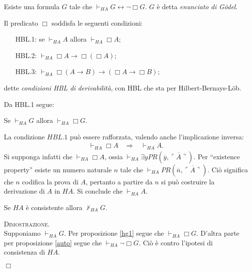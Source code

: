 	\begin{prop}
	\label{auto}
	Esiste una formula $G$ tale che $\vdash_{HA} G \leftrightarrow\neg\Box G$.
	$G$ \`e detta \textit{enunciato di G\"odel}.
	\end{prop}

	\begin{thm} Il predicato $\Box$ soddisfa le seguenti condizioni:

	\begin{itemize}
 	\item[\small{HBL.1}:] se $\vdash_{HA}A$ allora $\vdash_{HA}\Box A$;
 	\item[\small{HBL.2}:] $\vdash_{HA} \Box A\rightarrow \Box(\Box A)$;
 	\item[\small{HBL.3}:] $\vdash_{HA} \Box(A\rightarrow B)
 	\rightarrow (\Box A\rightarrow \Box B)$;
	\end{itemize}
	dette \textit{condizioni HBL di derivabilit\`a}, con HBL che
	sta per Hilbert-Bernays-L\"ob.
	\end{thm}

	Da HBL.1 segue:

	\begin{prop}
	\label{hg1}Se $\vdash_{HA} G$ allora $\vdash_{HA}\Box G$.
	\end{prop}

	\begin{oss}
	\label{oss:HBL}
	La condizione $HBL.1$ pu\`o essere rafforzata, valendo anche l'implicazione inversa:
	\begin{eqnarray}
	\vdash_{HA}\Box A\:\:\:\:\Rightarrow\:\:\:\:\vdash_{HA} A.\nonumber
	\end{eqnarray}
	Si supponga infatti che $\vdash_{HA}\Box A$, ossia $\vdash_{HA}\exists
	yPR(\overline{y},\overline{\ulcorner A \urcorner})$.
	Per ``existence property''  esiste un numero naturale $n$ tale
	che $\vdash_{HA} PR(\overline{n},\overline{\ulcorner A \urcorner})$.
	Ci\`o significa che $n$ codifica la prova di $A$, pertanto a
	partire da $n$ si pu\`o costruire la derivazione di $A$ in $HA$.
	Si conclude che $\vdash_{HA} A$.
	\end{oss}

	\begin{thm}
	\label{teo:nonG}
	Se $HA$ \`e consistente allora $\not\vdash_{HA} G$.
	\end{thm}

	\textsc{Dimostrazione.}\\
	Supponiamo $\vdash_{HA} G$. Per proposizione \ref{hg1}
	segue che $\vdash_{HA}\Box G$.
	D'altra parte per proposizione \ref{auto} segue che
	$\vdash_{HA}\neg\Box G$. Ci\`o \`e 
	contro l'ipotesi di consistenza di $HA$.
	\begin{flushright}$\Box$\end{flushright}

